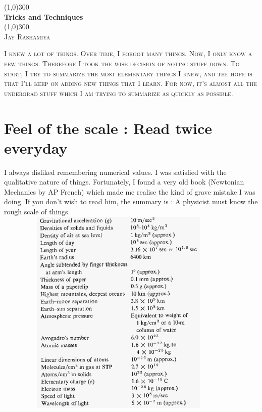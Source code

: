 \documentclass{report}
\author{Jay Rashamiya}
\begin{document}
\begin{titlepage}
  \begin{center}
    \line(1,0){300}\\
    \huge{\bfseries Tricks and Techniques}\\
    \line(1,0){300}\\
    \textsc{\LARGE Jay Rashamiya}\\
    \vspace{5cm}
  \end{center}

  \noindent \textsc{\large I knew a lot of things. Over time, I forgot many things. Now, I only know a few things. Therefore I took the wise decision of noting stuff down. To start, I try to summarize the most elementary things I knew, and the hope is that I'll keep on adding new things that I learn. For now, it's almost all the undergrad stuff which I am trying to summarize as quickly as possible.}
\end{titlepage}

\tableofcontents


\chapter{Feel of the scale : Read twice everyday}

I always disliked remembering numerical values. I was satisfied with the qualitative nature of things. Fortunately, I found a very old book (Newtonian Mechanics by AP French) which made me realise the kind of grave mistake I was doing. If you don't wish to read him, the summary is : A physicist must know the rough scale of things.\\

\includegraphics[width= 12cm, height=10cm]{./Images/Scales.png}
\end{document}
